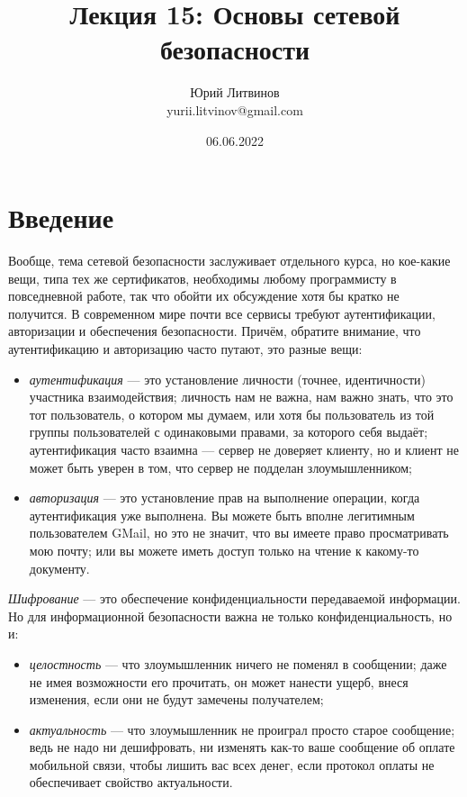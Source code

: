 \documentclass[a5paper]{article}
\title{Лекция 15: Основы сетевой безопасности}
\author{Юрий Литвинов\\\small{yurii.litvinov@gmail.com}}
\date{06.06.2022}
\begin{document}
\maketitle
\thispagestyle{empty}

\section{Введение}

Вообще, тема сетевой безопасности заслуживает отдельного курса, но кое-какие вещи, типа тех же сертификатов, необходимы любому программисту в повседневной работе, так что обойти их обсуждение хотя бы кратко не получится. В современном мире почти все сервисы требуют аутентификации, авторизации и обеспечения безопасности. Причём, обратите внимание, что аутентификацию и авторизацию часто путают, это разные вещи:

\begin{itemize}
    \item \textit{аутентификация} --- это установление личности (точнее, идентичности) участника взаимодействия; личность нам не важна, нам важно знать, что это тот пользователь, о котором мы думаем, или хотя бы пользователь из той группы пользователей с одинаковыми правами, за которого себя выдаёт; аутентификация часто взаимна --- сервер не доверяет клиенту, но и клиент не может быть уверен в том, что сервер не подделан злоумышленником;
    \item \textit{авторизация} --- это установление прав на выполнение операции, когда аутентификация уже выполнена. Вы можете быть вполне легитимным пользователем GMail, но это не значит, что вы имеете право просматривать мою почту; или вы можете иметь доступ только на чтение к какому-то документу.
\end{itemize}

\textit{Шифрование} --- это обеспечение конфиденциальности передаваемой информации. Но для информационной безопасности важна не только конфиденциальность, но и:

\begin{itemize}
    \item \textit{целостность} --- что злоумышленник ничего не поменял в сообщении; даже не имея возможности его прочитать, он может нанести ущерб, внеся изменения, если они не будут замечены получателем;
    \item \textit{актуальность} --- что злоумышленник не проиграл просто старое сообщение; ведь не надо ни дешифровать, ни изменять как-то ваше сообщение об оплате мобильной связи, чтобы лишить вас всех денег, если протокол оплаты не обеспечивает свойство актуальности.
\end{itemize}
\end{document}
